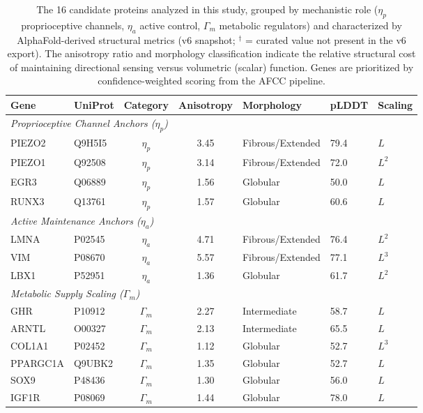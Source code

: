 \begin{table}[h!]
\centering
\caption{The 16 candidate proteins analyzed in this study, grouped by mechanistic role ($\eta_p$ proprioceptive channels, $\eta_a$ active control, $\Gamma_m$ metabolic regulators) and characterized by AlphaFold-derived structural metrics (v6 snapshot; $^\dagger$ = curated value not present in the v6 export). The anisotropy ratio and morphology classification indicate the relative structural cost of maintaining directional sensing versus volumetric (scalar) function. Genes are prioritized by confidence-weighted scoring from the AFCC pipeline.}
\label{tab:dissipation_proteins}
\scriptsize
\begin{tabular}{llcclll}
\toprule
\textbf{Gene} & \textbf{UniProt} & \textbf{Category} & \textbf{Anisotropy} & \textbf{Morphology} & \textbf{pLDDT} & \textbf{Scaling} \\
\midrule
\multicolumn{7}{l}{\textit{Proprioceptive Channel Anchors ($\eta_{p}$)}} \\
PIEZO2 & Q9H5I5 & $\eta_{p}$ & 3.45 & Fibrous/Extended & 79.4 & $L$ \\
PIEZO1 & Q92508 & $\eta_{p}$ & 3.14 & Fibrous/Extended & 72.0 & $L^2$ \\
EGR3 & Q06889 & $\eta_{p}$ & 1.56 & Globular & 50.0 & $L$ \\
RUNX3 & Q13761 & $\eta_{p}$ & 1.57 & Globular & 60.6 & $L$ \\
\midrule
\multicolumn{7}{l}{\textit{Active Maintenance Anchors ($\eta_{a}$)}} \\
LMNA & P02545 & $\eta_{a}$ & 4.71 & Fibrous/Extended & 76.4 & $L^2$ \\
VIM & P08670 & $\eta_{a}$ & 5.57 & Fibrous/Extended & 77.1 & $L^3$ \\
LBX1 & P52951 & $\eta_{a}$ & 1.36 & Globular & 61.7 & $L^2$ \\
\midrule
\multicolumn{7}{l}{\textit{Metabolic Supply Scaling ($\Gamma_{m}$)}} \\
GHR & P10912 & $\Gamma_{m}$ & 2.27 & Intermediate & 58.7 & $L$ \\
ARNTL & O00327 & $\Gamma_{m}$ & 2.13 & Intermediate & 65.5 & $L$ \\
COL1A1 & P02452 & $\Gamma_{m}$ & 1.12 & Globular & 52.7 & $L^3$ \\
PPARGC1A & Q9UBK2 & $\Gamma_{m}$ & 1.35 & Globular & 52.7 & $L$ \\
SOX9 & P48436 & $\Gamma_{m}$ & 1.30 & Globular & 56.0 & $L$ \\
IGF1R & P08069 & $\Gamma_{m}$ & 1.44 & Globular & 78.0 & $L$ \\
\bottomrule
\end{tabular}
\end{table}
